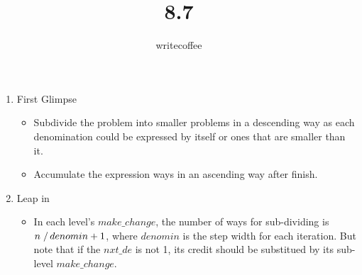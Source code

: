 \documentclass[11pt]{article}
\author{writecoffee} \title{8.7}
\begin{document}
\maketitle

{\setlength{\baselineskip}{1\baselineskip}
\setlength{\parindent}{0pt}
\setlength{\parskip}{2ex plus 0.5ex minus 0.2ex}
\begin{enumerate}[1.]
\item
	First Glimpse
	\begin{itemize}
	\item
		Subdivide the problem into smaller problems in a descending way as each denomination could be expressed by itself or ones that are smaller than it.
	\item
		Accumulate the expression ways in an ascending way after finish.
	\end{itemize}
\item
	Leap in
	\begin{itemize}
	\item
		In each level's $make\_change$, the number of ways for sub-dividing is $n \left.\right/ denomin + 1$, where $denomin$ is the step width for each iteration. But %
		note that if the $nxt\_de$ is not 1, its credit should be substitued by its sub-level $make\_change$.
	\end{itemize}
\end{enumerate}
\par}
%
%
\end{document}

